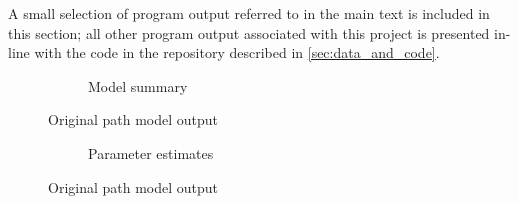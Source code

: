 \documentclass[11pt,a4paper]{article}
\begin{document}
A small selection of program output referred to in the main text is included in this section; all other program output associated with this project is presented in-line with the code in the repository described in \cref{sec:data_and_code}.

\pagestyle{empty}

\begin{figure}[htbp]
\begin{subfigure}{\textwidth}
\small{}
\caption{Model summary}
\end{subfigure}
\caption{Original path model output}
\label{fig:orig_model_output}
\end{figure}

\begin{figure}[htbp]\ContinuedFloat
\begin{subfigure}{\textwidth}

\caption{Parameter estimates}
\end{subfigure}
\caption{Original path model output}
\end{figure}

\restoregeometry{}
\end{document}

